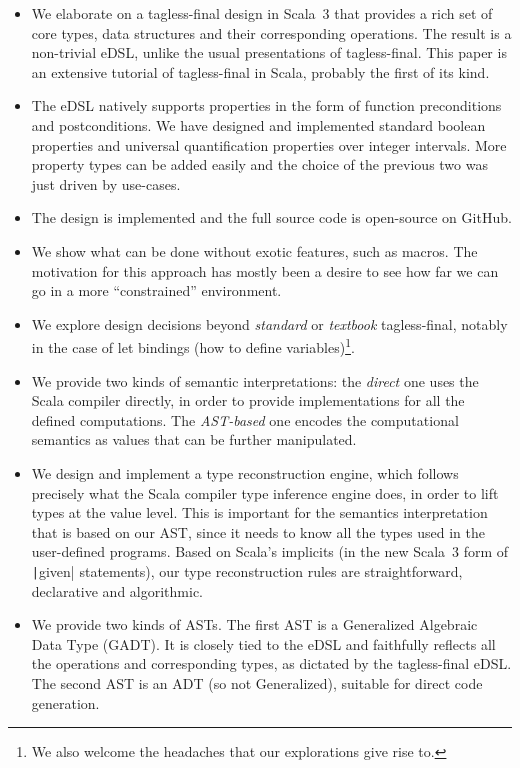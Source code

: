 \documentclass[11pt]{article}
\newcommand{\ScalaI}[1]{\texttt|#1|}
\begin{document}
\begin{itemize}
	\item We elaborate on a tagless-final design in Scala~3 that provides a rich set of core types, data structures and their corresponding operations. The result is a non-trivial eDSL, unlike the usual presentations of tagless-final. This paper is an extensive tutorial of tagless-final in Scala, probably the first of its kind.
	
	\item The eDSL natively supports properties in the form of function preconditions and postconditions. We have designed and implemented standard boolean properties and universal quantification properties over integer intervals. More property types can be added easily and the choice of the previous two was just driven by use-cases.
	
	\item The design is implemented and the full source code is open-source on GitHub.
		
	\item We show what can be done without exotic features, such as macros. The motivation for this approach has mostly been a desire to see how far we can go in a more ``constrained'' environment.
	
	\item We explore design decisions beyond \textit{standard} or \textit{textbook} tagless-final, notably in the case of let bindings (how to define variables)\footnote{We also welcome the headaches that our explorations give rise to.}.
	
	\item We provide two kinds of semantic interpretations: the \textit{direct} one uses the Scala compiler directly, in order to provide implementations for all the defined computations. The \textit{AST-based} one encodes the computational semantics as values that can be further manipulated.
	
	\item We design and implement a type reconstruction engine, which follows precisely what the Scala compiler type inference engine does, in order to lift types at the value level. This is important for the semantics interpretation that is based on our AST, since it needs to know all the types used in the user-defined programs. Based on Scala's implicits (in the new Scala~3 form of \ScalaI{given} statements), our type reconstruction rules are straightforward, declarative and algorithmic.
	
	\item We provide two kinds of ASTs. The first AST is a Generalized Algebraic Data Type (GADT). It is closely tied to the eDSL and faithfully reflects all the operations and corresponding types, as dictated by the tagless-final eDSL. The second AST is an ADT (so not Generalized), suitable for direct code generation.
	

\end{itemize}
\end{document}
